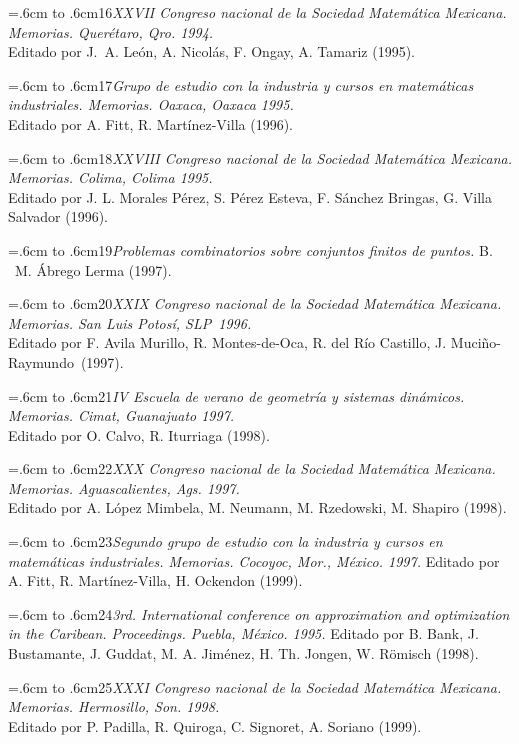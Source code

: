\documentclass[10pt,pagesize]{scrbook}
\numberwithin{equation}{chapter}
\def\bibl#1{\hangindent=.6cm \noindent \hbox to .6cm{#1\hfill}}
\begin{document}
\bibl{16}{\itshape XXVII Congreso nacional de la Sociedad Matemática
Mexicana. Memorias. Querétaro, Qro. 1994.} \\
Editado por J.$\!$~A. León, A. Nicolás, F. Ongay, A. Tamariz
(1995). %

\bibl{17}{\itshape Grupo de estudio con la industria y cursos en
matemáticas industriales. Memorias. Oaxaca, Oaxaca 1995.}\\
Editado por A. Fitt, R. Martínez-Villa (1996).

\bibl{18}{\itshape XXVIII Congreso nacional de la Sociedad Matemática
Mexicana. Memorias. Colima, Colima 1995.} \\
Editado por J.$\!$ L. Morales Pérez, S. Pérez Esteva, F.
Sánchez Bringas, G. Villa Salvador (1996). %

\bibl{19}{\itshape Problemas combinatorios sobre conjuntos finitos de
puntos.} 
B.$\!$~M. Ábrego Lerma (1997). %

\bibl{20}{\itshape XXIX Congreso nacional de la Sociedad Matemática
Mexicana. Memorias. $\!$San Luis Potosí, SLP~1996.} \\ 
Editado por F. Avila Murillo, R. Montes-de-Oca, R. del Río
Castillo, J. Muciño-Raymundo~(1997). %

\bibl{21}{\itshape IV Escuela de verano de geometría y sistemas
dinámicos. Memorias. Cimat, Guanajuato 1997.} \\
Editado por O. Calvo, R. Iturriaga (1998). %

\bibl{22}{\itshape XXX Congreso nacional de la Sociedad Matemática
Mexicana. Memorias. Aguascalientes, Ags. 1997.} \\
Editado por A. López Mimbela, M. Neumann, M. Rzedowski, M.
Shapiro (1998). %

\bibl{23}{\itshape Segundo grupo de estudio con la industria y cursos 
en matemáticas industriales. Memorias. Cocoyoc, Mor., México. 
1997.}
Editado por A. Fitt, R. Martínez-Villa, H. Ockendon (1999). %

\bibl{24}{\itshape 3rd. International conference on approximation and
optimization in the Caribean. Proceedings. Puebla, México. 1995.}
Editado por B. Bank, J. Bustamante, J. Guddat, M. A.
Jiménez, H. Th. Jongen, W. R\"omisch (1998). %

\bibl{25}{\itshape XXXI Congreso nacional de la Sociedad
Matemática Mexicana. Memorias. Hermosillo, Son. 1998.} \\
Editado por P. Padilla, R. Quiroga, C. Signoret, A. Soriano (1999).
\end{document}
